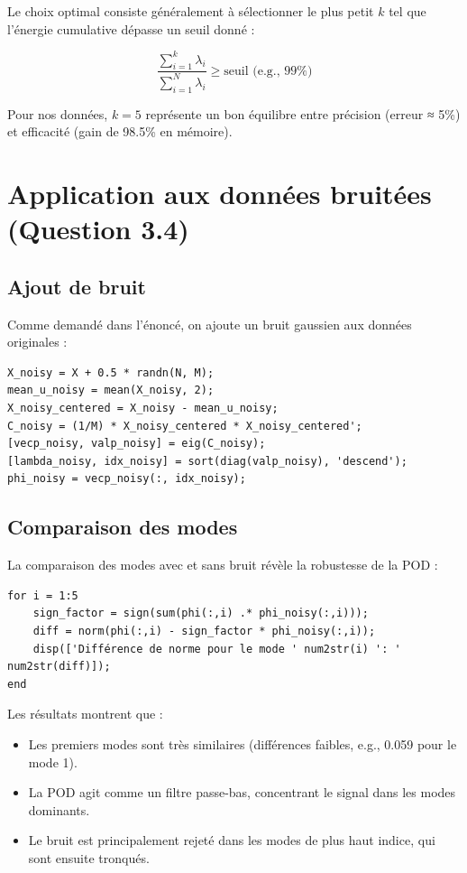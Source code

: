 \documentclass{rapportECL}
\begin{document}
Le choix optimal consiste généralement à sélectionner le plus petit \( k \) tel que l'énergie cumulative dépasse un seuil donné :

\[
\frac{\sum_{i=1}^k \lambda_i}{\sum_{i=1}^N \lambda_i} \geq \text{seuil (e.g., 99\%)}
\]

Pour nos données, \( k=5 \) représente un bon équilibre entre précision (erreur ≈ 5\%) et efficacité (gain de 98.5\% en mémoire).

\section{Application aux données bruitées (Question 3.4)}

\subsection{Ajout de bruit}
Comme demandé dans l'énoncé, on ajoute un bruit gaussien aux données originales :

\begin{lstlisting}[caption={Ajout de bruit et POD sur données bruitées}, label=code:noisy]
X_noisy = X + 0.5 * randn(N, M);
mean_u_noisy = mean(X_noisy, 2);
X_noisy_centered = X_noisy - mean_u_noisy;
C_noisy = (1/M) * X_noisy_centered * X_noisy_centered';
[vecp_noisy, valp_noisy] = eig(C_noisy);
[lambda_noisy, idx_noisy] = sort(diag(valp_noisy), 'descend');
phi_noisy = vecp_noisy(:, idx_noisy);
\end{lstlisting}


\subsection{Comparaison des modes}
La comparaison des modes avec et sans bruit révèle la robustesse de la POD :

\begin{lstlisting}[caption={Comparaison des modes avec/sans bruit}, label=code:compare]
for i = 1:5
    sign_factor = sign(sum(phi(:,i) .* phi_noisy(:,i)));
    diff = norm(phi(:,i) - sign_factor * phi_noisy(:,i));
    disp(['Différence de norme pour le mode ' num2str(i) ': ' num2str(diff)]);
end
\end{lstlisting}

Les résultats montrent que :
\begin{itemize}
    \item Les premiers modes sont très similaires (différences faibles, e.g., 0.059 pour le mode 1).
    \item La POD agit comme un filtre passe-bas, concentrant le signal dans les modes dominants.
    \item Le bruit est principalement rejeté dans les modes de plus haut indice, qui sont ensuite tronqués.
\end{itemize}
\end{document}
